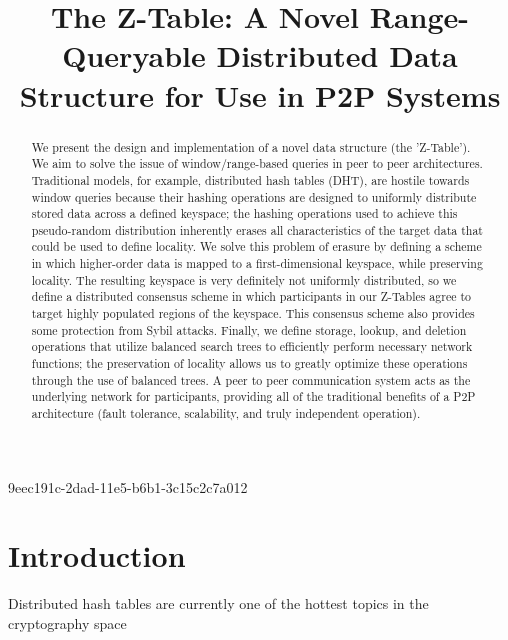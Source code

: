 \documentclass[12pt]{article}
\title{The Z-Table: A Novel Range-Queryable Distributed Data Structure for Use in P2P Systems}
\begin{document}
\maketitle

\begin{abstract}
We present the design and implementation of a novel data structure (the 'Z-Table'). We aim to solve the issue of window/range-based queries in peer to peer architectures. Traditional models, for example,  distributed hash tables (DHT), are hostile towards window queries because their hashing operations are designed to uniformly distribute stored data across a defined keyspace; the hashing operations used to achieve this pseudo-random distribution inherently erases all characteristics of the target data that could be used to define locality. We solve this problem of erasure by defining a scheme in which higher-order data is mapped to a first-dimensional keyspace, while preserving locality. The resulting keyspace is very definitely not uniformly distributed, so we define a distributed consensus scheme in which participants in our Z-Tables agree to target highly populated regions of the keyspace. This consensus scheme also provides some protection from Sybil attacks. Finally, we define storage, lookup, and deletion operations that utilize balanced search trees to efficiently perform necessary network functions; the preservation of locality allows us to greatly optimize these operations through the use of balanced trees. A peer to peer communication system acts as the underlying network for participants, providing all of the traditional benefits of a P2P architecture (fault tolerance, scalability, and truly independent operation).
\end{abstract}


\newpage
9eec191c-2dad-11e5-b6b1-3c15c2c7a012\section{Introduction}
Distributed hash tables are currently one of the hottest topics in the cryptography space~\cite{Stoica:2001dj,Rowstron:2001ea,Ratnasamy:2001wn}

\printbibliography
\end{document}
